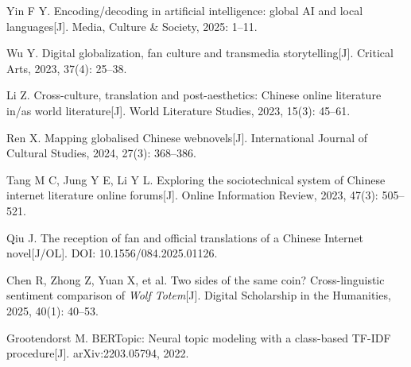 \documentclass[12pt, a4paper]{article}
\begin{document}
{\noindent [17] Yin F Y. Encoding/decoding in artificial intelligence: global AI and local languages[J]. Media, Culture \& Society, 2025: 1--11.


\noindent [19] Wu Y. Digital globalization, fan culture and transmedia storytelling[J]. Critical Arts, 2023, 37(4): 25--38.



\noindent [24] Li Z. Cross-culture, translation and post-aesthetics: Chinese online literature in/as world literature[J]. World Literature Studies, 2023, 15(3): 45--61.



\noindent [27] Ren X. Mapping globalised Chinese webnovels[J]. International Journal of Cultural Studies, 2024, 27(3): 368--386.

\noindent [28] Tang M C, Jung Y E, Li Y L. Exploring the sociotechnical system of Chinese internet literature online forums[J]. Online Information Review, 2023, 47(3): 505--521.



\noindent [36] Qiu J. The reception of fan and official translations of a Chinese Internet novel[J/OL]. DOI: 10.1556/084.2025.01126.

\noindent [37] Chen R, Zhong Z, Yuan X, et al. Two sides of the same coin? Cross-linguistic sentiment comparison of \textit{Wolf Totem}[J]. Digital Scholarship in the Humanities, 2025, 40(1): 40--53.


\noindent [41] Grootendorst M. BERTopic: Neural topic modeling with a class-based TF-IDF procedure[J]. arXiv:2203.05794, 2022.

}
\end{document}

